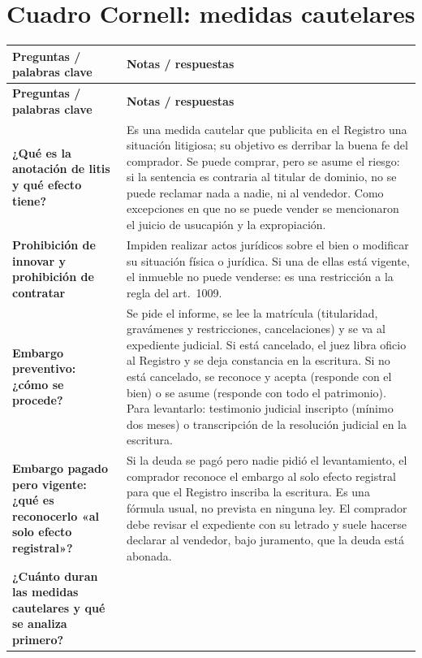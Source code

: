 \documentclass[12pt,oneside]{book}
\begin{document}
\section*{Cuadro Cornell: medidas cautelares}

\begin{longtable}{>{\raggedright\arraybackslash}p{}>{\raggedright\arraybackslash}p{}}
\toprule
\textbf{Preguntas / palabras clave} & \textbf{Notas / respuestas} \\
\midrule
\endfirsthead
\toprule
\textbf{Preguntas / palabras clave} & \textbf{Notas / respuestas} \\
\midrule
\endhead
\textbf{¿Qué es la anotación de litis y qué efecto tiene?} &
Es una medida cautelar que publicita en el Registro una situación litigiosa; su objetivo es derribar la buena fe del comprador. Se puede comprar, pero se asume el riesgo: si la sentencia es contraria al titular de dominio, no se puede reclamar nada a nadie, ni al vendedor. Como excepciones en que no se puede vender se mencionaron el juicio de usucapión y la expropiación. \\[0.6em]
\textbf{Prohibición de innovar y prohibición de contratar} &
Impiden realizar actos jurídicos sobre el bien o modificar su situación física o jurídica. Si una de ellas está vigente, el inmueble no puede venderse: es una restricción a la regla del art.\ 1009. \\[0.6em]
\textbf{Embargo preventivo: ¿cómo se procede?} &
Se pide el informe, se lee la matrícula (titularidad, gravámenes y restricciones, cancelaciones) y se va al expediente judicial. Si está cancelado, el juez libra oficio al Registro y se deja constancia en la escritura. Si no está cancelado, se reconoce y acepta (responde con el bien) o se asume (responde con todo el patrimonio). Para levantarlo: testimonio judicial inscripto (mínimo dos meses) o transcripción de la resolución judicial en la escritura. \\[0.6em]
\textbf{Embargo pagado pero vigente: ¿qué es reconocerlo «al solo efecto registral»?} &
Si la deuda se pagó pero nadie pidió el levantamiento, el comprador reconoce el embargo al solo efecto registral para que el Registro inscriba la escritura. Es una fórmula usual, no prevista en ninguna ley. El comprador debe revisar el expediente con su letrado y suele hacerse declarar al vendedor, bajo juramento, que la deuda está abonada. \\[0.6em]
\textbf{¿Cuánto duran las medidas cautelares y qué se analiza primero?} &

\end{longtable}
\end{document}
